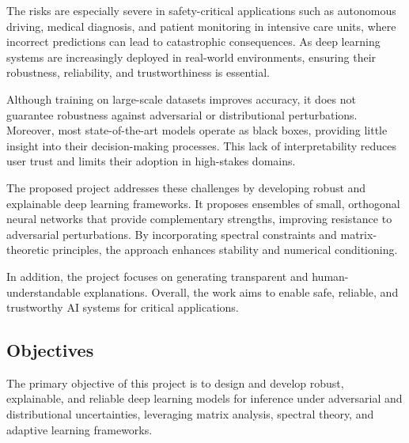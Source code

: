 \documentclass[a4paper,11pt]{article}
\begin{document}
The risks are especially severe in safety-critical applications such as autonomous driving, medical diagnosis, and patient monitoring in intensive care units, where incorrect predictions can lead to catastrophic consequences. As deep learning systems are increasingly deployed in real-world environments, ensuring their robustness, reliability, and trustworthiness is essential.

Although training on large-scale datasets improves accuracy, it does not guarantee robustness against adversarial or distributional perturbations. Moreover, most state-of-the-art models operate as black boxes, providing little insight into their decision-making processes. This lack of interpretability reduces user trust and limits their adoption in high-stakes domains.

The proposed project addresses these challenges by developing robust and explainable deep learning frameworks. It proposes ensembles of small, orthogonal neural networks that provide complementary strengths, improving resistance to adversarial perturbations. By incorporating spectral constraints and matrix-theoretic principles, the approach enhances stability and numerical conditioning.

In addition, the project focuses on generating transparent and human-understandable explanations. Overall, the work aims to enable safe, reliable, and trustworthy AI systems for critical applications.



\subsection{Objectives}
The primary objective of this project is to design and develop robust, explainable, and reliable deep learning models for inference under adversarial and distributional uncertainties, leveraging matrix analysis, spectral theory, and adaptive learning frameworks.
\end{document}
